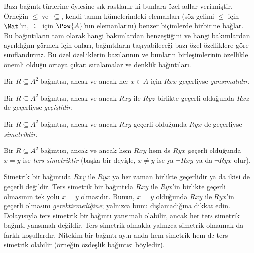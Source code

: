 


\begin{intro}
Bazı bağıntı türlerine öylesine sık rastlanır ki bunlara özel adlar verilmiştir.
Örneğin $\le$ ve~$\subseteq$, kendi tanım kümelerindeki elemanları (söz gelimi
$\le$ için $\Nat$'ın, $\subseteq$ için $\Pow{A}$'nın elemanlarını) benzer
biçimlerde birbirine bağlar. Bu bağıntıların tam olarak hangi bakımlardan
benzeştiğini ve hangi bakımlardan ayrıldığını görmek için onları, bağıntıların
taşıyabileceği bazı özel özelliklere göre sınıflandırırız. Bu özel özelliklerin
bazılarının ve bunların birleşimlerinin özellikle önemli olduğu ortaya çıkar:
sıralamalar ve denklik bağıntıları.
\end{intro}

\begin{defn}[Yansımalılık]
Bir $R \subseteq A^2$ bağıntısı, ancak ve ancak her $x \in A$ için $Rxx$
geçerliyse \emph{yansımalıdır}.
\end{defn}

\begin{defn}[Geçişlilik]
Bir $R \subseteq A^2$ bağıntısı, ancak ve ancak $Rxy$ ile $Ryz$ birlikte geçerli
olduğunda $Rxz$ de geçerliyse \emph{geçişlidir}.
\end{defn}

\begin{defn}[Simetriklik]
Bir $R \subseteq A^2$ bağıntısı, ancak ve ancak $Rxy$ geçerli olduğunda
$Ryx$ de geçerliyse \emph{simetriktir}.
\end{defn}

\begin{defn}
Bir $R \subseteq A^2$ bağıntısı, ancak ve ancak hem $Rxy$ hem de $Ryx$ geçerli
olduğunda $x=y$ ise \emph{ters simetriktir} (başka bir deyişle,
$x\neq y$ ise ya $\lnot Rxy$ ya da $\lnot Ryx$ olur).
\end{defn}

\begin{explain}
Simetrik bir bağıntıda $Rxy$ ile $Ryx$ ya her zaman birlikte geçerlidir ya da
ikisi de geçerli değildir. Ters simetrik bir bağıntıda $Rxy$ ile $Ryx$'in
birlikte geçerli olmasının tek yolu $x=y$ olmasıdır. Bunun, $x=y$ olduğunda
$Rxy$ ile $Ryx$'in geçerli olmasını \emph{gerektirmediğine}; yalnızca bunu
dışlamadığına dikkat edin. Dolayısıyla ters simetrik bir bağıntı yansımalı
olabilir, ancak her ters simetrik bağıntı yansımalı değildir. Ters simetrik
olmakla yalnızca simetrik olmamak da farklı koşullardır. Nitekim bir bağıntı
aynı anda hem simetrik hem de ters simetrik olabilir (örneğin özdeşlik bağıntısı
böyledir).
\end{explain}


